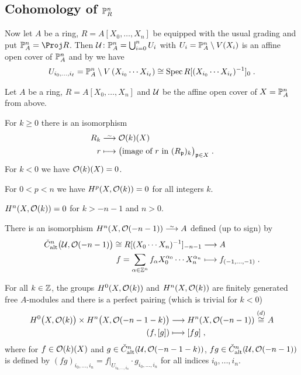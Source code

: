 \documentclass[a4paper,parskip=half,numbers=enddot, DIV=12]{scrreprt}
\renewcommand{\geq}{\geqslant}
\begin{document}
\subsection{Cohomology of \texorpdfstring{$\mathbb{P}_R^n$}{P}}	
Now let $A$ be a ring, $R=A[X_0,\ldots,X_n]$ be equipped with the usual grading and put $\IP_A^n=\Proj R$. Then $\mathcal{U}\colon \mathbb{P}_A^n=\bigcup_{i=0}^nU_i$ with $U_i=\mathbb{P}_A^n\setminus V(X_i)$ is an affine open cover of $\mathbb{P}_A^n$ and by  we have
\begin{align*}
	U_{i_0,\ldots,i_\ell}=\mathbb{P}_A^n\setminus V\left(X_{i_0}\cdots X_{i_\ell}\right)\cong \operatorname{Spec} R[(X_{i_0}\cdots X_{i_\ell})^{-1}]_0\;.
\end{align*}
\begin{thm}
	Let $A$ be a ring, $R=A[X_0,\ldots,X_n]$ and $\mathcal{U}$ be the affine open cover of $X=\mathbb{P}_A^n$ from above. 
	\begin{alphanumerate}
		\item  For $k\geq 0$ there is an isomorphism
		\begin{align}\lbl{eq:Oo(k)(IP^n)}
			\begin{split}
				R_k&\isomorphism \Oo(k)(X)\\
				r&\longmapsto \big(\text{image of }r\text{ in }(R_\pp)_k\big)_{\pp\in X}\;.
			\end{split}
		\end{align}
		For $k<0$ we have $\mathcal{O}(k)(X)=0$.
		\item For $0<p<n$ we have $H^p(X,\mathcal{O}(k))=0$ for all integers $k$.
		\item $H^n(X,\mathcal{O}(k))=0$ for $k>-n-1$ and $n>0$.
		\item There is an isomorphism $H^n(X,\Oo(-n-1))\isomorphism A$ defined (up to sign) by
		\begin{align}\lbl{eq:H^nIP^nO(-n-1)}
			\begin{split}
				\check{C}_\alt^n\big(\Uu,\Oo(-n-1)\big)\cong R[(X_0\cdots X_n)^{-1}]_{-n-1}&\morphism A\\
				f=\sum_{\alpha\in\IZ^n}f_\alpha X_0^{\alpha_0}\cdots X_n^{\alpha_n}&\longmapsto f_{(-1,\ldots,-1)}\;.
			\end{split}
		\end{align}
		\item For all $k\in\mathbb{Z}$, the groups $H^0(X,\mathcal{O}(k))$ and $H^n(X,\mathcal{O}(k))$ are finitely generated free $A$-modules and there is a perfect pairing (which is trivial for $k<0$)
		\begin{align}\lbl{eq:nonDegCohoPairing}
			\begin{split}
				H^0\big(X,\Oo(k)\big)\times H^n\big(X,\Oo(-n-1-k)\big)&\morphism H^n(X,\Oo(-n-1))\overset{\text{\itememph{d}}}{\cong}A\\
				(f,[g])&\longmapsto [fg]\;,
			\end{split}
		\end{align}
		where for $f\in\mathcal{O}(k)(X)$ and $g\in\check{C}_{\mathrm{alt}}^n(\mathcal{U},\mathcal{O}(-n-1-k))$,  $fg\in\check{C}_{\mathrm{alt}}^n(\mathcal{U},\mathcal{O}(-n-1))$ is defined by $(fg)_{i_0,\ldots,i_n}=f|_{U_{i_0,\ldots,i_n}}\cdot g_{i_0,\ldots,i_n}$ for all indices $i_0,\ldots,i_n$.
	\end{alphanumerate}
\end{thm}
\end{document}
